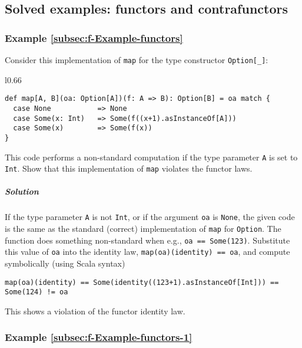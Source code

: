 \subsection{Solved examples: functors and contrafunctors}

\subsubsection{Example \label{subsec:f-Example-functors}\ref{subsec:f-Example-functors}}

Consider this implementation of \lstinline!map! for the type constructor
\lstinline!Option[_]!:

\begin{wrapfigure}{l}{0.66\columnwidth}%
\vspace{-0.85\baselineskip}
\begin{lstlisting}
def map[A, B](oa: Option[A])(f: A => B): Option[B] = oa match {
  case None           => None
  case Some(x: Int)   => Some(f((x+1).asInstanceOf[A]))
  case Some(x)        => Some(f(x))
}
\end{lstlisting}

\vspace{-1\baselineskip}
\end{wrapfigure}%

\noindent This code performs a non-standard computation if the type
parameter \lstinline!A! is set to \lstinline!Int!. Show that this
implementation of \lstinline!map! violates the functor laws.

\subparagraph{Solution}

If the type parameter \lstinline!A! is not \lstinline!Int!, or if
the argument \lstinline!oa! is \lstinline!None!, the given code
is the same as the standard (correct) implementation of \lstinline!map!
for \lstinline!Option!. The function does something non-standard
when e.g., \lstinline!oa == Some(123)!. Substitute this value of
\lstinline!oa! into the identity law, \lstinline!map(oa)(identity) == oa!,
and compute symbolically (using Scala syntax)
\begin{lstlisting}
map(oa)(identity) == Some(identity((123+1).asInstanceOf[Int])) == Some(124) != oa
\end{lstlisting}
This shows a violation of the functor identity law.

\subsubsection{Example \label{subsec:f-Example-functors-1}\ref{subsec:f-Example-functors-1}}

